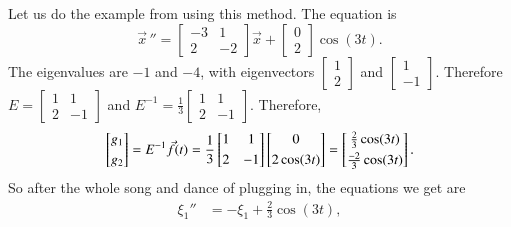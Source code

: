 \documentclass[12pt]{book}
\begin{document}
\begin{example}
Let us do the example from  using this method.
The equation is
\begin{equation*}
{\vec{x}\,}'' =
\begin{bmatrix}
-3 & 1 \\
2 & -2
\end{bmatrix}
\vec{x} 
+ 
\begin{bmatrix}
0 \\ 2
\end{bmatrix}
\cos (3 t) .
\end{equation*}
The eigenvalues are $-1$ and $-4$, with eigenvectors 
$\left[ \begin{smallmatrix} 1 \\ 2 \end{smallmatrix} \right]$ and
$\left[ \begin{smallmatrix} 1 \\ -1 \end{smallmatrix} \right]$.
Therefore $E =
\left[ \begin{smallmatrix} 1 & 1 \\ 2 & -1 \end{smallmatrix} \right]$
and
$E^{-1} =
\frac{1}{3}
\left[ \begin{smallmatrix} 1 & 1 \\ 2 & -1 \end{smallmatrix}
\right]$.
Therefore,
\begin{equation*}
\begin{bmatrix}
g_1 \\
\noalign{\smallskip}
g_2
\end{bmatrix}
=
E^{-1} \vec{f}(t)
=
\frac{1}{3}
\begin{bmatrix} 1 & 1 \\
\noalign{\smallskip}
2 & -1 \end{bmatrix}
\begin{bmatrix} 0 \\
\noalign{\smallskip}
2\cos (3t) \end{bmatrix}
=
\begin{bmatrix} \frac{2}{3}\cos (3t)
\\
\noalign{\smallskip}
\frac{-2}{3}\cos (3t) \end{bmatrix} .
\end{equation*}
So after the whole song and dance of plugging in, the equations we get are
\begin{align*}
\xi_1'' & = - \xi_1 + \frac{2}{3} \cos (3t) , \\

\end{align*}
\end{example}
\end{document}
